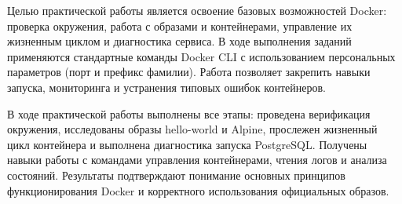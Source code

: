 \documentclass[14pt]{extreport}
\begin{document}
\pagestyle{empty} 



\pagestyle{plain} 
\tableofcontents
\intro

Целью практической работы является освоение базовых возможностей Docker: проверка окружения, работа с образами и контейнерами, управление их жизненным циклом и диагностика сервиса. В ходе выполнения заданий применяются стандартные команды Docker CLI с использованием персональных параметров (порт и префикс фамилии). Работа позволяет закрепить навыки запуска, мониторинга и устранения типовых ошибок контейнеров.



 
\conclusions

В ходе практической работы выполнены все этапы: проведена верификация окружения, исследованы образы hello-world и Alpine, прослежен жизненный цикл контейнера и выполнена диагностика запуска PostgreSQL. Получены навыки работы с командами управления контейнерами, чтения логов и анализа состояний. Результаты подтверждают понимание основных принципов функционирования Docker и корректного использования официальных образов.
\end{document}

